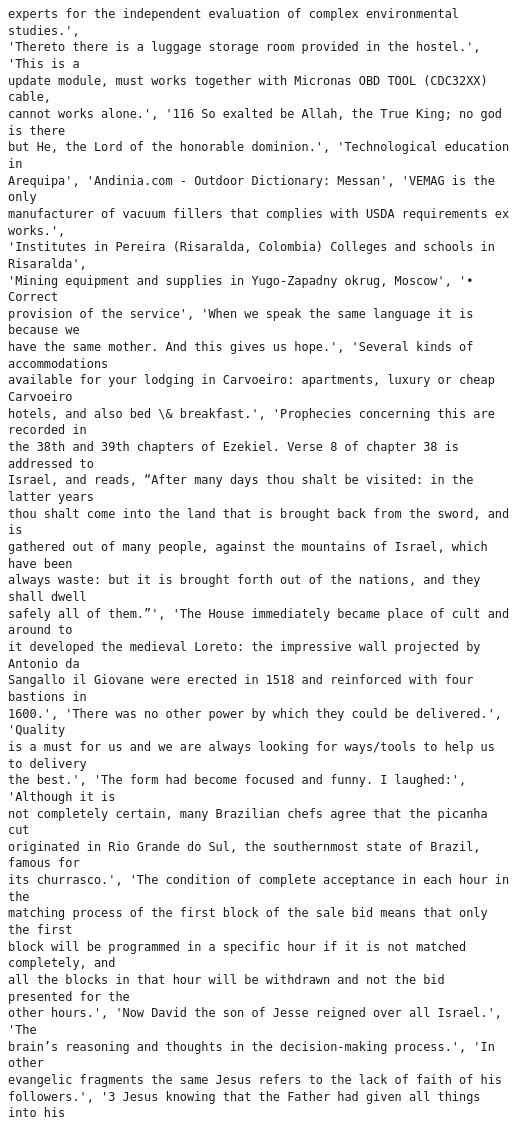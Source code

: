 \documentclass[10pt]{article}
\begin{document}
\begin{Verbatim}[commandchars=\\\{\}]
experts for the independent evaluation of complex environmental studies.',
'Thereto there is a luggage storage room provided in the hostel.', 'This is a
update module, must works together with Micronas OBD TOOL (CDC32XX) cable,
cannot works alone.', '116 So exalted be Allah, the True King; no god is there
but He, the Lord of the honorable dominion.', 'Technological education in
Arequipa', 'Andinia.com - Outdoor Dictionary: Messan', 'VEMAG is the only
manufacturer of vacuum fillers that complies with USDA requirements ex works.',
'Institutes in Pereira (Risaralda, Colombia) Colleges and schools in Risaralda',
'Mining equipment and supplies in Yugo-Zapadny okrug, Moscow', '• Correct
provision of the service', 'When we speak the same language it is because we
have the same mother. And this gives us hope.', 'Several kinds of accommodations
available for your lodging in Carvoeiro: apartments, luxury or cheap Carvoeiro
hotels, and also bed \& breakfast.', 'Prophecies concerning this are recorded in
the 38th and 39th chapters of Ezekiel. Verse 8 of chapter 38 is addressed to
Israel, and reads, “After many days thou shalt be visited: in the latter years
thou shalt come into the land that is brought back from the sword, and is
gathered out of many people, against the mountains of Israel, which have been
always waste: but it is brought forth out of the nations, and they shall dwell
safely all of them.”', 'The House immediately became place of cult and around to
it developed the medieval Loreto: the impressive wall projected by Antonio da
Sangallo il Giovane were erected in 1518 and reinforced with four bastions in
1600.', 'There was no other power by which they could be delivered.', 'Quality
is a must for us and we are always looking for ways/tools to help us to delivery
the best.', 'The form had become focused and funny. I laughed:', 'Although it is
not completely certain, many Brazilian chefs agree that the picanha cut
originated in Rio Grande do Sul, the southernmost state of Brazil, famous for
its churrasco.', 'The condition of complete acceptance in each hour in the
matching process of the first block of the sale bid means that only the first
block will be programmed in a specific hour if it is not matched completely, and
all the blocks in that hour will be withdrawn and not the bid presented for the
other hours.', 'Now David the son of Jesse reigned over all Israel.', 'The
brain’s reasoning and thoughts in the decision-making process.', 'In other
evangelic fragments the same Jesus refers to the lack of faith of his
followers.', '3 Jesus knowing that the Father had given all things into his

\end{Verbatim}
\end{document}
